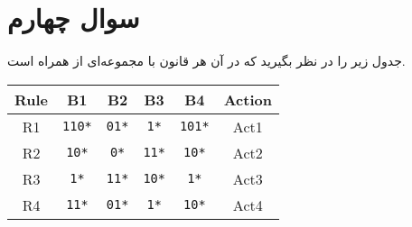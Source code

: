 \section{سوال چهارم}

جدول  زیر را در نظر بگیرید که در آن هر قانون با مجموعه‌ای از  همراه است.

\begin{latin}
	\begin{center}
		\begin{tabular}{|c|c|c|c|c|c|}
			\hline
			\textbf{Rule} & \textbf{B1} & \textbf{B2} & \textbf{B3} & \textbf{B4} & \textbf{Action} \\
			\hline\hline
			R1 & \texttt{110*} & \texttt{01*} & \texttt{1*} & \texttt{101*} & Act1 \\
			\hline\hline
			R2 & \texttt{10*} & \texttt{0*} & \texttt{11*} & \texttt{10*} & Act2 \\
			\hline
			R3 & \texttt{1*} & \texttt{11*} & \texttt{10*} & \texttt{1*} & Act3 \\
			\hline
			R4 & \texttt{11*} & \texttt{01*} & \texttt{1*} & \texttt{10*} & Act4 \\
			\hline
		\end{tabular}
	\end{center}
\end{latin}


